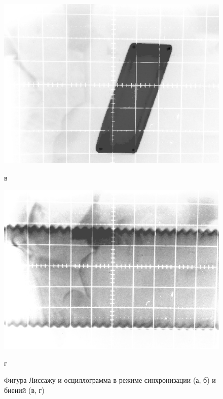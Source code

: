 \begin{figure}[H]
	\begin{minipage}{.45\linewidth}
		\centering
		\includegraphics[width=\linewidth]{img/2s.jpg}
		\caption*{в}
	\end{minipage}
	\begin{minipage}{.45\linewidth}
		\centering
		\includegraphics[width=\linewidth]{img/3s.jpg}
		\caption*{г}
	\end{minipage}
	\caption{Фигура Лиссажу и осциллограмма в режиме синхронизации (а, б) и биений (в, г)}
	\label{fig:6}
\end{figure}


